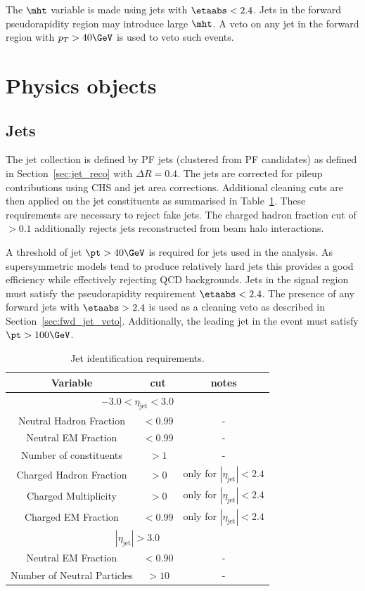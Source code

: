 The $\mht$ variable is made using jets with $\etaabs < 2.4$. Jets in the forward pseudorapidity 
region may introduce large $\mht$. A veto on any jet in the forward region with $p_T > 40\GeV$
is used to veto such events. 
\label{sec:fwd_jet_veto}
\section{Physics objects}
\subsection{Jets}

The jet collection is defined by PF jets (clustered from PF candidates) as defined in Section~\ref{sec:jet_reco} with
$\Delta R = 0.4$. The jets are corrected for pileup contributions using CHS and jet area corrections. Additional cleaning cuts are then applied
on the jet constituents as summarised in Table~\ref{tab:loose-jet-id}. These requirements are necessary to reject fake jets. The charged hadron
fraction cut of $> 0.1$ additionally rejects jets reconstructed from beam halo interactions.

A threshold of jet $\pt > 40\GeV$ is required for jets used in the analysis. As supersymmetric models tend to produce
relatively hard jets this provides a good efficiency while effectively rejecting QCD backgrounds. Jets in the signal 
region must satisfy the pseudorapidity requirement $\etaabs < 2.4$. The presence of any forward jets with $\etaabs > 2.4$
is used as a cleaning veto as described in Section~\ref{sec:fwd_jet_veto}. Additionally, the leading jet in the 
event must satisfy $\pt > 100\GeV$. 
\begin{table}[ht!]
  \caption{Jet identification requirements. \label{tab:loose-jet-id}}
  \centering
  \begin{tabular}{ ccc }
    \hline
    \hline
    Variable & cut & notes \\ \hline
    \multicolumn{3}{c}{$-3.0 < \eta_{\mathrm{jet}} < 3.0$} \\ \hline    
    Neutral Hadron Fraction & $<0.99$ & - \\
    Neutral EM Fraction & $<0.99$ & - \\
    Number of constituents & $>1$ & - \\
    Charged Hadron Fraction & $>0$ & only for $|\eta_{\mathrm{jet}}| < 2.4$ \\
    Charged Multiplicity & $>0$ & only for $|\eta_{\mathrm{jet}}| < 2.4$ \\
    Charged EM Fraction & $<0.99$ & only for $|\eta_{\mathrm{jet}}| < 2.4$ \\ \hline
    \multicolumn{3}{c}{$|\eta_{\mathrm{jet}}| > 3.0$} \\ \hline        
    Neutral EM Fraction & $<0.90$ & - \\
    Number of Neutral Particles & $>10$ & - \\
    \hline
    \hline
  \end{tabular}
\end{table}

